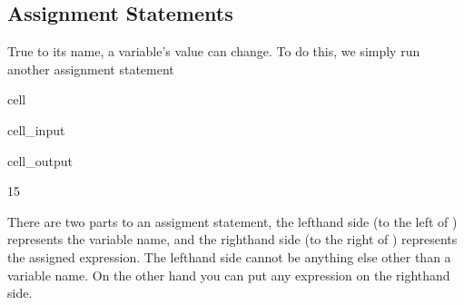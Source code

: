\documentclass[letterpaper,10pt,english]{jupyterBook}
\begin{document}
\subsection{Assignment Statements}
\label{\detokenize{expressions:assignment-statements}}
\sphinxAtStartPar
True to its name, a variable’s value can change. To do this, we simply run another assignment statement

\begin{sphinxuseclass}{cell}\begin{sphinxVerbatimInput}

\begin{sphinxuseclass}{cell_input}
\begin{sphinxVerbatim}[commandchars=\\\{\}]
  
\end{sphinxVerbatim}

\end{sphinxuseclass}\end{sphinxVerbatimInput}
\begin{sphinxVerbatimOutput}

\begin{sphinxuseclass}{cell_output}
\begin{sphinxVerbatim}[commandchars=\\\{\}]
15
\end{sphinxVerbatim}

\end{sphinxuseclass}\end{sphinxVerbatimOutput}

\end{sphinxuseclass}
\sphinxAtStartPar
There are two parts to an assigment statement, the left\sphinxhyphen{}hand side (to the left of \sphinxcode{\sphinxupquote{=}}) represents the variable name, and the right\sphinxhyphen{}hand side (to the right of \sphinxcode{\sphinxupquote{=}}) represents the assigned expression. The left\sphinxhyphen{}hand side cannot be anything else other than a variable name. On the other hand you can put any expression on the right\sphinxhyphen{}hand side.
\end{document}
